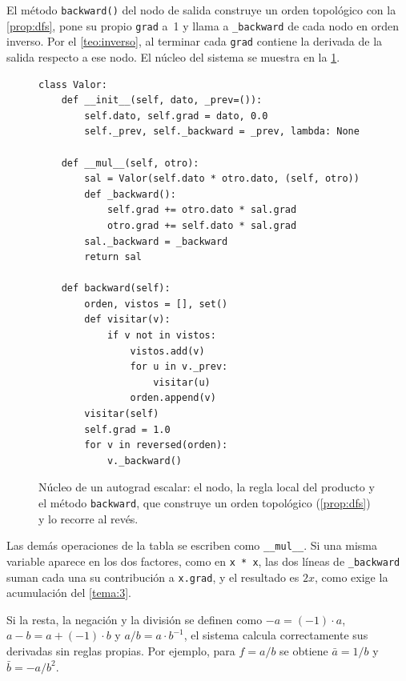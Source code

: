 El método \texttt{backward()} del nodo de salida construye un orden topológico con la \cref{prop:dfs}, pone su propio \texttt{grad} a~1 y llama a \texttt{\_backward} de cada nodo en orden inverso. Por el \cref{teo:inverso}, al terminar cada \texttt{grad} contiene la derivada de la salida respecto a ese nodo. El núcleo del sistema se muestra en la \cref{fig:valor}.

\begin{figure}[htbp]
\centering
\begin{minipage}{0.8\textwidth}
{\small
\begin{verbatim}
class Valor:
    def __init__(self, dato, _prev=()):
        self.dato, self.grad = dato, 0.0
        self._prev, self._backward = _prev, lambda: None

    def __mul__(self, otro):
        sal = Valor(self.dato * otro.dato, (self, otro))
        def _backward():
            self.grad += otro.dato * sal.grad
            otro.grad += self.dato * sal.grad
        sal._backward = _backward
        return sal

    def backward(self):
        orden, vistos = [], set()
        def visitar(v):
            if v not in vistos:
                vistos.add(v)
                for u in v._prev:
                    visitar(u)
                orden.append(v)
        visitar(self)
        self.grad = 1.0
        for v in reversed(orden):
            v._backward()
\end{verbatim}
}
\end{minipage}
\caption{Núcleo de un autograd escalar: el nodo, la regla local del producto y el método \texttt{backward}, que construye un orden topológico (\cref{prop:dfs}) y lo recorre al revés.}
\label{fig:valor}
\end{figure}

Las demás operaciones de la tabla se escriben como \texttt{\_\_mul\_\_}. Si una misma variable aparece en los dos factores, como en \texttt{x * x}, las dos líneas de \texttt{\_backward} suman cada una su contribución a \texttt{x.grad}, y el resultado es $2x$, como exige la acumulación del \cref{tema:3}.

\begin{proposicion}\label{prop:derivadas}
Si la resta, la negación y la división se definen como $-a=(-1)\cdot a$, $a-b=a+(-1)\cdot b$ y $a/b=a\cdot b^{-1}$, el sistema calcula correctamente sus derivadas sin reglas propias. Por ejemplo, para $f=a/b$ se obtiene $\bar a=1/b$ y $\bar b=-a/b^{2}$.
\end{proposicion}

